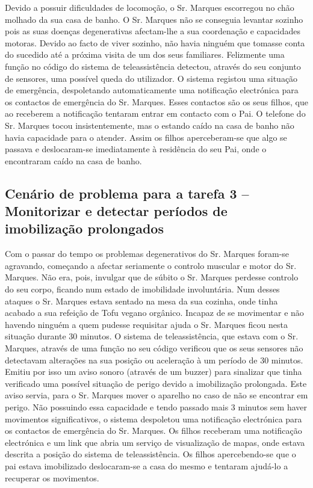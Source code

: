 Devido a possuir dificuldades de locomoção, o Sr. Marques escorregou no chão molhado da sua casa de banho. O Sr. Marques não se conseguia levantar sozinho pois as suas doenças degenerativas afectam-lhe a sua coordenação e capacidades motoras.
Devido ao facto de viver sozinho, não havia ninguém que tomasse conta do sucedido até a próxima visita de um dos seus familiares. Felizmente uma função no código do sistema de teleassistência detectou, através do seu conjunto de sensores, uma possível queda do utilizador.
O sistema registou uma situação de emergência, despoletando automaticamente uma notificação electrónica para os contactos de emergência do Sr. Marques.
Esses contactos são os seus filhos, que ao receberem a notificação tentaram entrar em contacto com o Pai. O telefone do Sr. Marques tocou insistentemente, mas o estando caído na casa de banho não havia capacidade para o atender. Assim os filhos aperceberam-se que algo se passava e deslocaram-se imediatamente à residência do seu Pai, onde o encontraram caído na casa de banho. 


\subsection{Cenário de problema para a tarefa 3 – Monitorizar e detectar períodos de imobilização prolongados}

Com o passar do tempo os problemas degenerativos do Sr. Marques foram-se agravando, começando a afectar seriamente o controlo muscular e motor do Sr. Marques. Não era, pois, invulgar que de súbito o Sr. Marques perdesse controlo do seu corpo, ficando num estado de imobilidade involuntária.
Num desses ataques o Sr. Marques estava sentado na mesa da sua cozinha, onde tinha acabado a sua refeição de Tofu vegano orgânico. Incapaz de se movimentar e não havendo ninguém a quem pudesse requisitar ajuda o Sr. Marques ficou nesta situação durante 30 minutos. O sistema de teleassistência, que estava com o Sr. Marques, através de uma função no seu código verificou que os seus sensores não detectavam alterações na sua posição ou aceleração à um período de 30 minutos. Emitiu por isso um aviso sonoro (através de um buzzer) para sinalizar que tinha verificado uma possível situação de perigo devido a imobilização prolongada. Este aviso servia, para o Sr. Marques mover o aparelho no caso de não se encontrar em perigo. Não possuindo essa capacidade e tendo passado mais 3 minutos sem haver movimentos significativos, o sistema despoletou uma notificação electrónica para os contactos de emergência do Sr. Marques. Os filhos receberam uma notificação electrónica e um link que abria um serviço de visualização de mapas, onde estava descrita a posição do sistema de teleassistência.
Os filhos apercebendo-se que o pai estava imobilizado deslocaram-se a casa do mesmo e tentaram ajudá-lo a recuperar os movimentos.



